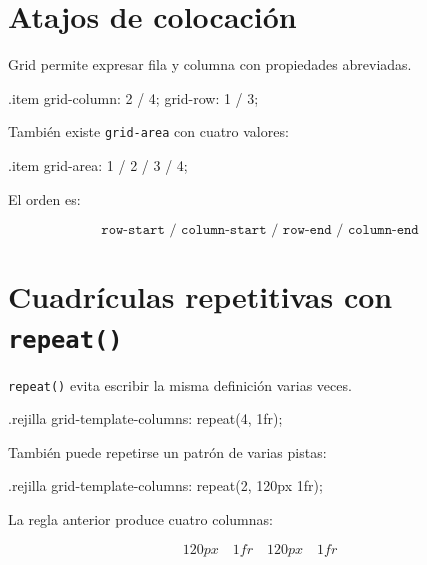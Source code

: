 \documentclass[11pt]{article}
\begin{document}

\section{Atajos de colocación}

Grid permite expresar fila y columna con propiedades abreviadas.

\begin{csscodedark}
.item {
    grid-column: 2 / 4;
    grid-row: 1 / 3;
}
\end{csscodedark}

También existe \texttt{grid-area} con cuatro valores:

\begin{csscodedark}
.item {
    grid-area: 1 / 2 / 3 / 4;
}
\end{csscodedark}

El orden es:

\[
\texttt{row-start / column-start / row-end / column-end}
\]


\section{Cuadrículas repetitivas con \texttt{repeat()}}

\texttt{repeat()} evita escribir la misma definición varias veces.

\begin{csscodedark}
.rejilla {
    grid-template-columns: repeat(4, 1fr);
}
\end{csscodedark}

También puede repetirse un patrón de varias pistas:

\begin{csscodedark}
.rejilla {
    grid-template-columns: repeat(2, 120px 1fr);
}
\end{csscodedark}

La regla anterior produce cuatro columnas:

\[
120px \quad 1fr \quad 120px \quad 1fr
\]
\end{document}
